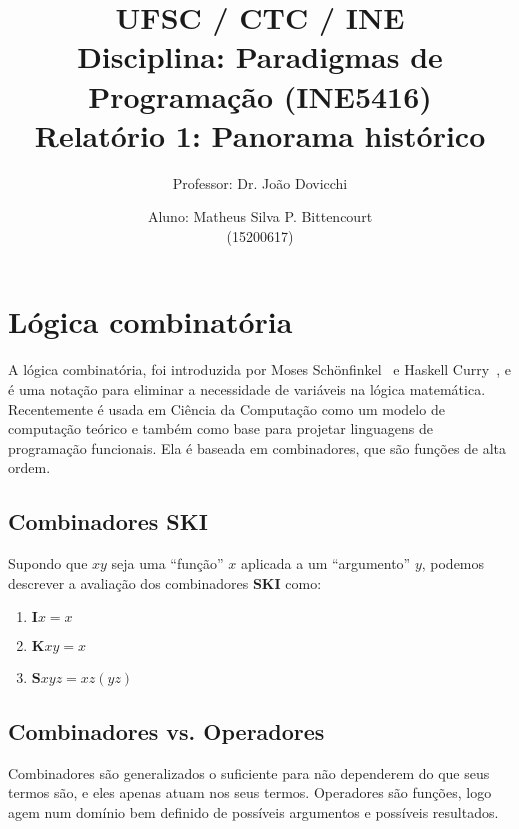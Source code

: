 \documentclass[a4paper,twocolumn,10pt]{article}
\begin{document}
\title{
	\large \rm UFSC / CTC / INE\\
	\large \rm Disciplina: Paradigmas de Programação (INE5416)\\
	\Large \bf Relatório 1: Panorama histórico
}

\author{
	Professor: Dr. João Dovicchi\\
	\and
	Aluno: Matheus Silva P. Bittencourt\\(15200617)
}

\maketitle

\thispagestyle{empty} %

\section{Lógica combinatória}

A lógica combinatória, foi introduzida por Moses Schönfinkel~\cite{Schonfinkel}
e Haskell Curry~\cite{Curry}, e é uma notação para eliminar a necessidade de
variáveis na lógica matemática. Recentemente é usada em Ciência da Computação
como um modelo de computação teórico e também como base para projetar
linguagens de programação funcionais. Ela é baseada em combinadores, que são
funções de alta ordem.

\subsection*{Combinadores SKI}

Supondo que \(xy\) seja uma ``função'' \(x\) aplicada a um ``argumento'' \(y\),
podemos descrever a avaliação dos combinadores \textbf{SKI} como:

\begin{enumerate}
	\item \(\mathbf{I}x = x\)
	\item \(\mathbf{K}xy = x\)
	\item \(\mathbf{S}xyz = xz(yz)\)
\end{enumerate}

\subsection*{Combinadores vs. Operadores}

Combinadores são generalizados o suficiente para não dependerem do que seus
termos são, e eles apenas atuam nos seus termos. Operadores são funções, logo
agem num domínio bem definido de possíveis argumentos e possíveis resultados.
\end{document}
